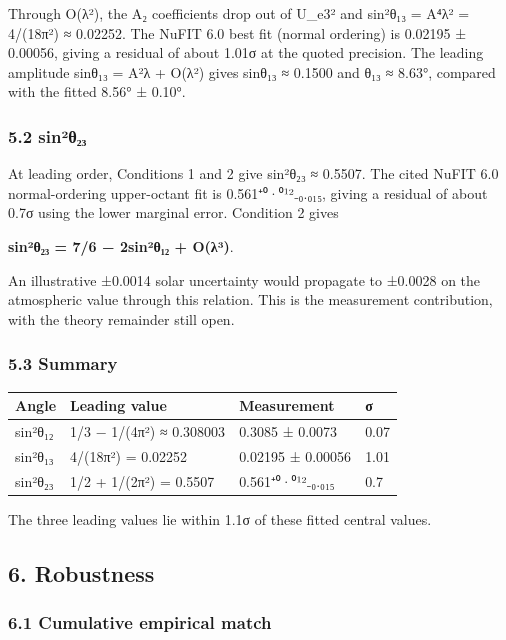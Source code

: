 \documentclass[
]{article}
\begin{document}
Through O(λ²), the A₂ coefficients drop out of \textbar U\_e3\textbar²
and sin²θ₁₃ = A⁴λ² = 4/(18π²) ≈ 0.02252. The NuFIT 6.0 best fit (normal
ordering) is 0.02195 ± 0.00056, giving a residual of about 1.01σ at the
quoted precision. The leading amplitude sinθ₁₃ = A²λ + O(λ²) gives
sinθ₁₃ ≈ 0.1500 and θ₁₃ ≈ 8.63°, compared with the fitted 8.56° ± 0.10°.

\hypertarget{sinuxb2ux3b8ux2082ux2083}{%
\subsubsection{5.2 sin²θ₂₃}\label{sinuxb2ux3b8ux2082ux2083}}

At leading order, Conditions 1 and 2 give sin²θ₂₃ ≈ 0.5507. The cited
NuFIT 6.0 normal-ordering upper-octant fit is 0.561⁺⁰·⁰¹²₋₀.₀₁₅, giving
a residual of about 0.7σ using the lower marginal error. Condition 2
gives

\textbf{sin²θ₂₃ = 7/6 − 2sin²θ₁₂ + O(λ³)}.

An illustrative ±0.0014 solar uncertainty would propagate to ±0.0028 on
the atmospheric value through this relation. This is the measurement
contribution, with the theory remainder still open.

\hypertarget{summary}{%
\subsubsection{5.3 Summary}\label{summary}}

\begin{longtable}[]{@{}llll@{}}
\toprule\noalign{}
Angle & Leading value & Measurement & σ \\
\midrule\noalign{}
\endhead
\bottomrule\noalign{}
\endlastfoot
sin²θ₁₂ & 1/3 − 1/(4π²) ≈ 0.308003 & 0.3085 ± 0.0073 & 0.07 \\
sin²θ₁₃ & 4/(18π²) = 0.02252 & 0.02195 ± 0.00056 & 1.01 \\
sin²θ₂₃ & 1/2 + 1/(2π²) = 0.5507 & 0.561⁺⁰·⁰¹²₋₀.₀₁₅ & 0.7 \\
\end{longtable}

The three leading values lie within 1.1σ of these fitted central values.

\hypertarget{robustness}{%
\subsection{6. Robustness}\label{robustness}}

\hypertarget{cumulative-empirical-match}{%
\subsubsection{6.1 Cumulative empirical
match}\label{cumulative-empirical-match}}
\end{document}
